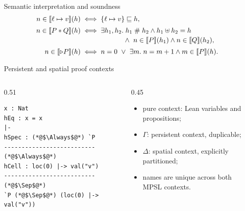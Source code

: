 \documentclass[10pt,aspectratio=169]{beamer}
\begin{document}
\begin{frame}{Semantic interpretation and soundness}
  \begin{align*}
    n\in\llbracket \ell\mapsto v \rrbracket(h)
      &\iff \{\ell\mapsto v\}\sqsubseteq h,\\[2pt]
    n\in\llbracket P\mathbin{*} Q \rrbracket(h)
      &\iff \exists h_1,h_2.\;
        h_1\mathrel{\#} h_2\land h_1\mathbin{\uplus} h_2=h\\[-1pt]
      &\hspace{2.2cm}\land\ n\in\llbracket P \rrbracket(h_1)
        \land n\in\llbracket Q \rrbracket(h_2),\\[2pt]
    n\in\llbracket \mathord{\triangleright} P \rrbracket(h)
      &\iff n=0\ \lor\
        \exists m.\;n=m+1\land m\in\llbracket P \rrbracket(h).
  \end{align*}

\end{frame}

\begin{frame}[fragile]{Persistent and spatial proof contexts}
  \begin{columns}[T,onlytextwidth]
    \begin{column}{0.51\textwidth}
\begin{lstlisting}[style=leancode]
x : Nat
hEq : x = x
|- 
hSpec : (*@$\Always$@*) `P
-------------------------- (*@$\Always$@*)
hCell : loc(0) |-> val("v")
-------------------------- (*@$\Sep$@*)
`P (*@$\Sep$@*) (loc(0) |-> val("v"))
\end{lstlisting}
    \end{column}
    \begin{column}{0.45\textwidth}
      \begin{itemize}
        \item pure context: Lean variables and propositions;
        \item $\Gamma$: persistent context, duplicable;
        \item $\Delta$: spatial context, explicitly partitioned;
        \item names are unique across both MPSL contexts.
      \end{itemize}
    \end{column}
  \end{columns}

  \vspace{0.25cm}
\end{frame}
\end{document}
